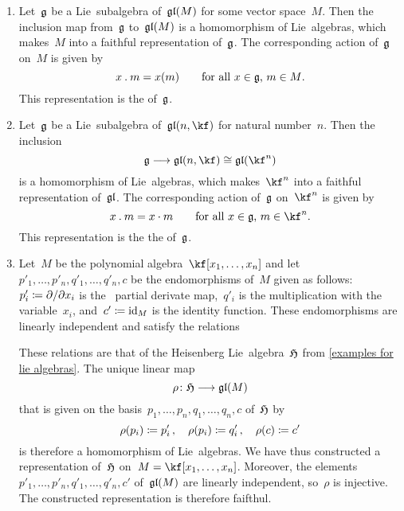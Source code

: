 \begin{examples}
  \label{examples for representations}
  \leavevmode
  \begin{enumerate}
    \item 
      Let~$\mathfrak{g}$ be a Lie~subalgebra of~$\mathfrak{gl}(M)$ for some vector space~$M$.
      Then the inclusion map from~$\mathfrak{g}$ to~$\mathfrak{gl}(M)$ is a homomorphism of Lie~algebras, which makes~$M$ into a faithful representation of~$\mathfrak{g}$.
      The corresponding action of~$\mathfrak{g}$ on~$M$ is given by
      \[
        x \mathbin{.} m
        =
        x(m)
        \qquad
        \text{for all~$x \in \mathfrak{g}$,~$m \in M$.}
      \]
      This representation is the  of~$\mathfrak{g}$.
    \item
      Let~$\mathfrak{g}$ be a Lie~subalgebra of~$\gllie(n, \kf)$ for natural number~$n$.
      Then the inclusion
      \[
        \glie \to \gllie(n, \kf) \cong \gllie(\kf^n)
      \]
      is a homomorphism of Lie~algebras, which makes~$\kf^n$ into a faithful representation of~$\mathfrak{gl}$.
      The corresponding action of~$\mathfrak{g}$ on~$\kf^n$ is given by
      \[
        x \act m
        =
        x \cdot m
        \qquad
        \text{for all~$x \in \glie$,~$m \in \kf^n$.}
      \]
      This representation is the the  of~$\mathfrak{g}$.
    \item
      Let~$M$ be the polynomial algebra~$\kf[x_1, \dotsc, x_n]$ and let~$p'_1, \dotsc, p'_n, q'_1, \dotsc, q'_n, c$ be the endomorphisms of~$M$ given as follows:
      $p'_i \defined \dd{x_i}$ is the~{} partial derivate map,~$q'_i$ is the multiplication with the variable~$x_i$, and~$c' \coloneqq \mathrm{id}_M$ is the identity function.
      These endomorphisms are linearly independent and satisfy the relations
      These relations are that of the Heisenberg Lie~algebra~$\mathfrak{H}$ from \cref{examples for lie algebras}.
      The unique linear map
      \[
        \rho
        \colon
        \Hlie
        \to
        \gllie(M)
      \]
      that is given on the basis~$p_1, \dotsc, p_n, q_1, \dotsc, q_n, c$ of~$\mathfrak{H}$ by
      \[
        \rho(p_i) \coloneqq p'_i \,,
        \quad
        \rho(p_i) \coloneqq q'_i \,,
        \quad
        \rho(c) \coloneqq c'
      \]
      is therefore a homomorphism of Lie~algebras.
      We have thus constructed a representation of~$\mathfrak{H}$ on~$M = \kf[x_1, \dotsc, x_n]$.
      Moreover, the elements~$p'_1, \dotsc, p'_n, q'_1, \dotsc, q'_n, c'$ of~$\mathfrak{gl}(M)$ are linearly independent, so~$\rho$ is injective.
      The constructed representation is therefore faifthul.


\end{enumerate}
\end{examples}
